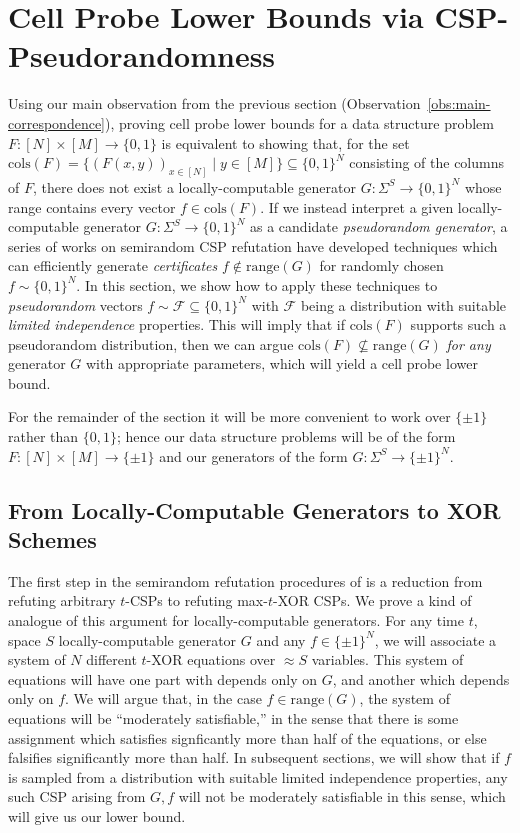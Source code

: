 \documentclass[11pt]{article}
\newcommand{\B}{\{0,1\}}
\newcommand{\rng}{\mathrm{range}}
\newcommand{\cols}{\mathrm{cols}}
\newcommand{\N}{[N]}
\begin{document}
\section{Cell Probe Lower Bounds via CSP-Pseudorandomness}\label{sec:indep-lbs}

Using our main observation from the previous section 
(Observation~\ref{obs:main-correspondence}), proving cell probe lower bounds for a data structure problem $F : [N] \times [M] \to \B$ is equivalent to showing that, for the set $\cols(F) = \{(F(x,y))_{ x\in \N} \mid y \in [M]\}\subseteq \B^N$ consisting of the columns of $F$, there does not exist a locally-computable generator $G: \Sigma^S \to \B^N$ whose range contains every vector $f\in \cols(F)$. 
If we instead interpret a given locally-computable generator $G: \Sigma^S \to \B^N$ as a candidate \emph{pseudorandom generator}, a series of works on semirandom CSP refutation \cite{feige-semirandom,aow,semirandom,smoothed,simpler-moore} have developed techniques which can efficiently generate \emph{certificates} $f \notin \rng(G)$ for randomly chosen $f \sim \B^N$. In this section, we show how to apply these techniques to \emph{pseudorandom} vectors $f \sim \mathcal{F} \subseteq \B^N$ with $\mathcal{F}$ being a distribution with suitable \emph{limited independence} properties. This will imply that if $\cols(F)$ supports such a pseudorandom distribution, then we can argue $\cols(F) \not\subseteq \rng(G)$ \emph{for any} generator $G$ with appropriate parameters, which will yield a cell probe lower bound. 


For the remainder of the section it will be more convenient to work over $\{\pm 1\}$ rather than $\B$; hence our data structure problems will be of the form $F: [N] \times [M] \to \{ \pm 1\}$ and our generators of the form $G: \Sigma^S \to \{\pm 1\}^N$. 

\subsection{From Locally-Computable Generators to XOR Schemes}
The first step in the semirandom refutation procedures of \cite{feige-semirandom,semirandom,smoothed} is a reduction from refuting arbitrary $t$-CSPs to refuting max-$t$-XOR CSPs. We prove a kind of analogue of this argument for locally-computable generators. For any time $t$, space $S$ locally-computable generator $G$ and any $f \in \{\pm 1\}^N$, we will associate a system of $N$ different $t$-XOR equations over $\approx S$ variables. This system of equations will have one part with depends only on $G$, and another which depends only on $f$. We will argue that, in the case $f \in \rng(G)$, the system of equations will be ``moderately satisfiable,'' in the sense that there is some assignment which satisfies signficantly more than half of the equations, or else falsifies significantly more than half. In subsequent sections, we will show that if $f$ is sampled from a distribution with suitable limited independence properties, any such CSP arising from $G,f$ will not be moderately satisfiable in this sense, which will give us our lower bound.
\end{document}
